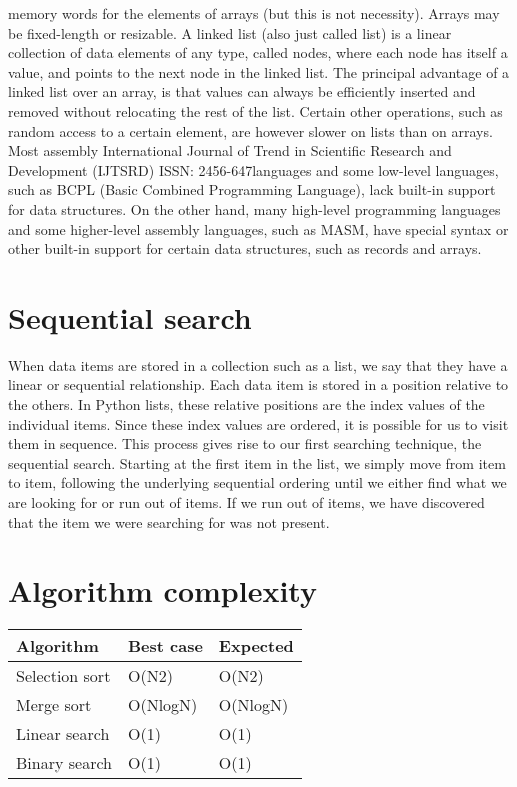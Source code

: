 \documentclass{article}
\begin{document}
memory words for the elements of arrays (but this is
not necessity). Arrays may be fixed-length or
resizable. A linked list (also just called list) is a linear
collection of data elements of any type, called nodes,
where each node has itself a value, and points to the
next node in the linked list. The principal advantage
of a linked list over an array, is that values can always
be efficiently inserted and removed without relocating
the rest of the list. Certain other operations, such as
random access to a certain element, are however
slower on lists than on arrays. Most assembly
International Journal of Trend in Scientific Research and Development (IJTSRD) ISSN: 2456-647languages and some low-level languages, such as
BCPL (Basic Combined Programming Language),
lack built-in support for data structures. On the other
hand, many high-level programming languages and
some higher-level assembly languages, such as
MASM, have special syntax or other built-in support
for certain data structures, such as records and arrays.
\section*{\textbf{Sequential search}}
When data items are stored in a collection such as a
list, we say that they have a linear or sequential
relationship. Each data item is stored in a position
relative to the others. In Python lists, these relative
positions are the index values of the individual items.
Since these index values are ordered, it is possible for
us to visit them in sequence. This process gives rise to
our first searching technique, the sequential search.
Starting at the first item in the list, we simply move
from item to item, following the underlying sequential
ordering until we either find what we are looking for
or run out of items. If we run out of items, we have
discovered that the item we were searching for was not present.
\begin{table}
\section*{\textbf{Algorithm complexity}}
\begin{center}

    \centering
    \begin{tabular}{ | m{10em} | m{10em}| m{10em} | } 
    \hline
         Algorithm & Best case & Expected \\
         \hline
         Selection sort & O(N2) & O(N2)\\
         \hline
         Merge sort & O(NlogN) & O(NlogN)\\
         \hline
         Linear search & O(1) & O(1)\\
         \hline
         Binary search & O(1) & O(1)\\
         \hline


    \end{tabular}

    \label{tab:my_label}
    \end{center}
\end{table}
\end{document}
